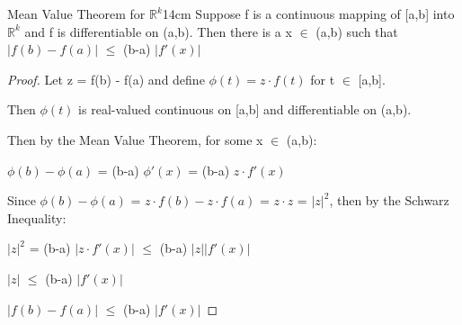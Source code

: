     \begin{wtheorem}{Mean Value Theorem for $\mathbb{R}^k$}{14cm}
        Suppose f is a continuous mapping of [a,b] into $\mathbb{R}^k$
        and f is differentiable on (a,b). Then there is a x $\in$ (a,b)
        such that $|f(b) - f(a)|$ $\leq$ (b-a) $|f'(x)|$        
    \end{wtheorem}

    \begin{proof}
        Let z = f(b) - f(a) and define $\phi(t) = z \cdot f(t)$
        for t $\in$ [a,b].

        Then $\phi(t)$ is real-valued continuous on [a,b]
        and differentiable on (a,b).

        Then by the Mean Value Theorem, for some x $\in$ (a,b):

        \hspace{0.5cm}
        $\phi(b) - \phi(a)$
        = (b-a) $\phi'(x)$
        = (b-a) $z \cdot f'(x)$

        Since $\phi(b) - \phi(a)$
        = $z \cdot f(b) - z \cdot f(a)$
        = $z \cdot z$ = $|z|^2$,
        then by the Schwarz Inequality:
        
        \hspace{0.5cm}
        $|z|^2$
        = (b-a) $|z \cdot f'(x)|$
        $\leq$ (b-a) $|z| |f'(x)|$
        
        \hspace{0.5cm}
        $|z|$
        $\leq$ (b-a) $|f'(x)|$

        \hspace{0.5cm}
        $|f(b) - f(a)|$
        $\leq$ (b-a) $|f'(x)|$
    \end{proof}




